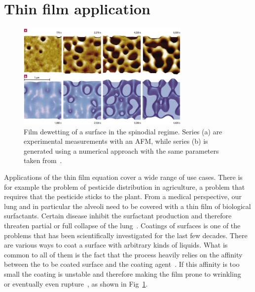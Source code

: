 \section{Thin film application}
\label{section:applications}
\begin{figure}
    \centering
    \includegraphics[width=0.75\textwidth]{graphics/41563_2003_Article_BFnmat788_Fig1_HTML.png}
    \caption{Film dewetting of a surface in the spinodial regime.
    Series (a) are experimental measurements with an AFM, while series (b) is generated using a numerical approach with the same parameters taken from~\cite{beckerComplexDewettingScenarios2003}.}
    \label{fig:becker_dewetting}
\end{figure}
Applications of the thin film equation cover a wide range of use cases. 
There is for example the problem of pesticide distribution in agriculture, a problem that requires that the pesticide sticks to the plant.
From a medical perspective, our lung and in particular the alveoli need to be covered with a thin film of biological surfactants.
Certain disease inhibit the surfactant production and therefore threaten partial or full collapse of the lung~\cite{doi:10.1146/annurev.fl.26.010194.002525}.
Coatings of surfaces is one of the problems that has been scientifically investigated for the last few decades.
There are various ways to coat a surface with arbitrary kinds of liquids.
What is common to all of them is the fact that the process heavily relies on the affinity between the to be coated surface and the coating agent~\cite{bonnWettingSpreading2009}.
If this affinity is too small the coating is unstable and therefore making the film prone to wrinkling~\cite{dasilvasobrinhoStudyDefectsUltrathin1999} or eventually even rupture~\cite{oronLongscaleEvolutionThin1997, crasterDynamicsStabilityThin2009, beckerComplexDewettingScenarios2003}, as shown in Fig~\ref{fig:becker_dewetting}.

